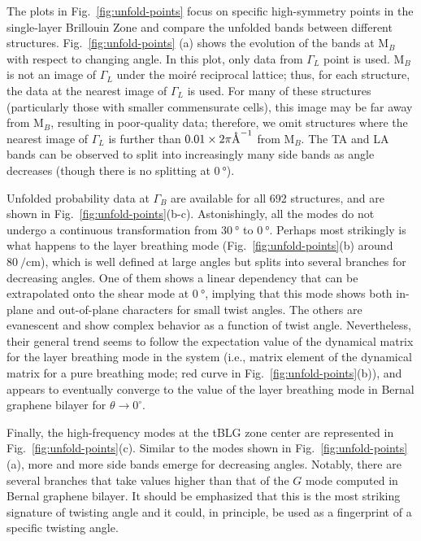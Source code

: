 \documentclass[prl,preprint]{revtex4}
\newcommand{\wavenumber}{\per\cm}
\newcommand{\KM}{\mathrm{M}}
\begin{document}
The plots in Fig.~\ref{fig:unfold-points} focus on specific high-symmetry points in the single-layer Brillouin Zone and compare the unfolded bands between different structures.  Fig.~\ref{fig:unfold-points} (a) shows the evolution of the bands at $\KM_B$ with respect to changing angle.  In this plot, only data from $\Gamma_L$ point is used.  $\KM_B$ is not an image of $\Gamma_L$ under the moir\'e reciprocal lattice; thus, for each structure, the data at the nearest image of $\Gamma_L$ is used.  For many of these structures (particularly those with smaller commensurate cells), this image may be far away from $\KM_B$, resulting in poor-quality data; therefore, we omit structures where the nearest image of $\Gamma_L$ is further than $0.01\times \smash{2\pi\si{\per\angstrom}}$ from $\KM_B$.  The \gls{TA} and \gls{LA} bands can be observed to split into increasingly many side bands as angle decreases (though there is no splitting at $\SI{0}{\degree}$).

Unfolded probability data at $\Gamma_B$ are available for all 692 structures, and are shown in Fig.~\ref{fig:unfold-points}(b-c).  Astonishingly, all the modes do not undergo a continuous transformation from $\SI{30}{\degree}$ to $\SI{0}{\degree}$.  Perhaps most strikingly is what happens to the layer breathing mode (Fig.~\ref{fig:unfold-points}(b) around $\SI{80}{\wavenumber}$), which is well defined at large angles but splits into several branches for decreasing angles. One of them shows a linear dependency that can be extrapolated onto the shear mode at $\SI{0}{\degree}$, implying that this mode shows both in-plane and out-of-plane characters for small twist angles. The others are evanescent and show complex behavior as a function of twist angle. Nevertheless, their general trend seems to follow the expectation value of the dynamical matrix for the layer breathing mode in the system (i.e., matrix element of the dynamical matrix for a pure breathing mode; red curve in Fig.~\ref{fig:unfold-points}(b)), and appears to eventually converge to the value of the layer breathing mode in Bernal graphene bilayer for $\theta\to 0^\circ$.  

Finally, the high-frequency modes at the tBLG zone center are represented in Fig.~\ref{fig:unfold-points}(c). Similar to the modes shown in Fig.~\ref{fig:unfold-points}(a), more and more side bands emerge for decreasing angles. Notably, there are several branches that take values higher than that of the $G$ mode computed in Bernal graphene bilayer. It should be emphasized that this is the most striking signature of twisting angle and it could, in principle, be used as a fingerprint of a specific twisting angle. 
\end{document}
